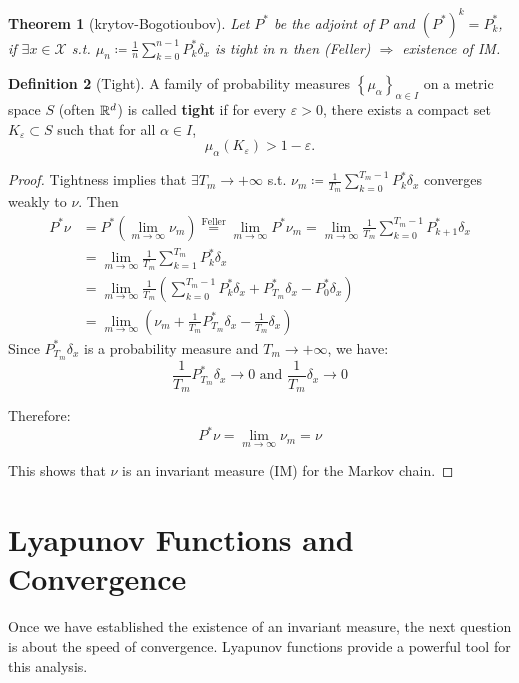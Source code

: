 \documentclass{amsart}
\let\originalmathbb\mathbb
\renewcommand{\mathbb}[1]{%
    \ifstrequal{#1}{1}{\mathbbm{#1}}{\originalmathbb{#1}}%
}
\theoremstyle{plain}
\newtheorem{theorem}{Theorem}[section]
\theoremstyle{definition}
\newtheorem{definition}[theorem]{Definition}
\theoremstyle{remark}
\begin{document}
\begin{theorem}[krytov-Bogotioubov]
Let $P^{*}$ be the adjoint of $P$ and $(P^{*})^{k}=P^{*}_k$, if $\exists x\in \mathcal{X}$ s.t.  $\mu _n\coloneqq \frac{1}{n}\sum_{k=0}^{n-1}P^{*}_k\delta_{x}$ is tight in $n$ then (Feller) $\Rightarrow$ existence of IM.
\end{theorem}
\begin{definition}[Tight]
A family of probability measures $\left\{\mu_\alpha\right\}_{\alpha \in I}$ on a metric space $S$ (often $\mathbb{R}^d$) is called \textbf{tight} if for every $\varepsilon>0$, there exists a compact set $K_\varepsilon \subset S$ such that for all $\alpha \in I$,
\[
\mu_\alpha(K_\varepsilon) > 1 - \varepsilon.
\]
\end{definition}
\begin{proof}
Tightness implies that $\exists T_m\to +\infty$ s.t. $\nu _m\coloneqq \frac{1}{T_m}\sum_{k=0}^{T_m-1}P^{*}_k\delta_{x}$ converges weakly to $\nu$. Then
\[
\begin{aligned}
P^{*}\nu & =P^{*}(\lim_{ m \to \infty }\nu _m)\overset{ \text{Feller} }{ = }\lim_{ m \to \infty }P^{*}\nu _m=\lim_{ m \to \infty } \frac{1}{T_m}\sum_{k=0}^{T_m-1} P^{*}_{k+1}\delta_{x} \\
 & =\lim_{ m \to \infty } \frac{1}{T_m}\sum_{k=1}^{T_m} P^{*}_{k}\delta_{x} \\
 & = \lim_{ m \to \infty } \frac{1}{T_m}\left(\sum_{k=0}^{T_m-1} P^{*}_{k}\delta_{x} + P^{*}_{T_m}\delta_{x} - P^{*}_0\delta_{x}\right) \\
 & = \lim_{ m \to \infty } \left(\nu_m + \frac{1}{T_m}P^{*}_{T_m}\delta_{x} - \frac{1}{T_m}\delta_{x}\right)
\end{aligned}
\]
Since $P^{*}_{T_m}\delta_{x}$ is a probability measure and $T_m \to +\infty$, we have:
\[
\frac{1}{T_m}P^{*}_{T_m}\delta_{x} \to 0 \text{ and } \frac{1}{T_m}\delta_{x} \to 0
\]

Therefore:
\[
P^{*}\nu = \lim_{ m \to \infty } \nu_m = \nu
\]

This shows that $\nu$ is an invariant measure (IM) for the Markov chain.
\end{proof}

\section{Lyapunov Functions and Convergence}

Once we have established the existence of an invariant measure, the next question is about the speed of convergence. Lyapunov functions provide a powerful tool for this analysis.
\end{document}
